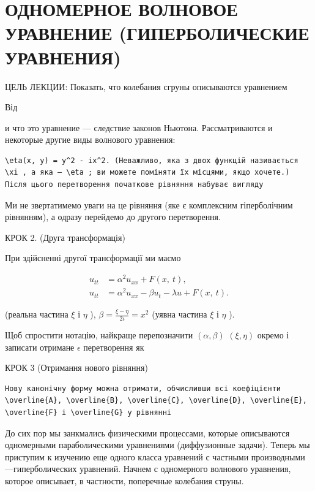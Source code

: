 \documentclass[
  ukrainian,
]{article}
\begin{document}
\section{ОДНОМЕРНОЕ ВОЛНОВОЕ УРАВНЕНИЕ (ГИПЕРБОЛИЧЕСКИЕ
УРАВНЕНИЯ)}\label{ux43eux434ux43dux43eux43cux435ux440ux43dux43eux435-ux432ux43eux43bux43dux43eux432ux43eux435-ux443ux440ux430ux432ux43dux435ux43dux438ux435-ux433ux438ux43fux435ux440ux431ux43eux43bux438ux447ux435ux441ux43aux438ux435-ux443ux440ux430ux432ux43dux435ux43dux438ux44f}

ЦЕЛЬ ЛЕКЦИИ: Показать, что колебания сгруны описываются уравнением

Від

и что это уравнение --- следствие законов Ньютона. Рассматриваются и
некоторые другие виды волнового уравнения:

\begin{verbatim}
\eta(x, y) = y^2 - ix^2. (Неважливо, яка з двох функцій називається \xi , а яка — \eta ; ви можете поміняти їх місцями, якщо хочете.) Після цього перетворення початкове рівняння набуває вигляду
\end{verbatim}

Ми не звертатимемо уваги на це рівняння (яке є комплексним гіперболічним
рівнянням), а одразу перейдемо до другого перетворення.

КРОК 2. (Друга трансформація)

При здійсненні другої трансформації ми маємо

\[
\begin{split} u_{tt} &= \alpha^2 u_{xx} + F\left(x, \ t\right), \\ u_{tt} &= \alpha^2 u_{xx} - \beta u_t - \lambda u + F\left(x, \ t\right). \end{split}
\]

(реальна частина \(\xi\) і \(\eta\) ),
\(\beta = \frac{\xi - \eta}{2\iota} = x^2\) (уявна частина \(\xi\) і
\(\eta\) ).

Щоб спростити нотацію, найкраще перепозначити \((\alpha,\beta)\)
\((\xi,\eta)\) окремо і записати отримане \(\epsilon\) перетворення як

КРОК 3 (Отримання нового рівняння)

\begin{verbatim}
Нову канонічну форму можна отримати, обчисливши всі коефіцієнти \overline{A}, \overline{B}, \overline{C}, \overline{D}, \overline{E}, \overline{F} і \overline{G} у рівнянні
\end{verbatim}

До сих пор мы занкмались физическими процессами, которые описываются
одномерными параболическими уравнениями (диффузионные задачи). Теперь мы
приступим к изучению еще одного класса уравнений с частными
производными---гиперболических уравнений. Начнем с одномерного волнового
уравнения, которое описывает, в частности, поперечные колебания струны.
\end{document}
